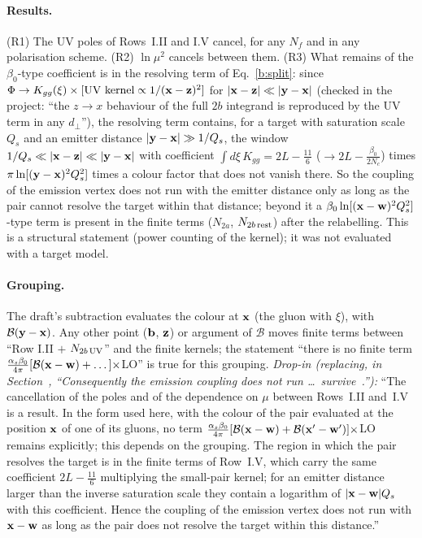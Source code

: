 \paragraph{Results.} (R1) The UV poles of Rows~I.II and I.V cancel, for any $N_f$ and in any polarisation scheme. (R2) $\ln\mu^2$ cancels between them. (R3) What remains of the $\beta_0$-type coefficient is in the resolving term of Eq.~\eqref{b:split}: since $\Phi\to K_{gg}(\xi)\times[\text{UV kernel}\propto1/(\mathbf{x}-\mathbf{z})^2]$ for $|\mathbf{x}-\mathbf{z}|\ll|\mathbf{y}-\mathbf{x}|$ (checked in the project: ``the $z\to x$ behaviour of the full $2b$ integrand is reproduced by the UV term in any $d_\perp$''), the resolving term contains, for a target with saturation scale $Q_s$ and an emitter distance $|\mathbf{y}-\mathbf{x}|\gg1/Q_s$, the window $1/Q_s\ll|\mathbf{x}-\mathbf{z}|\ll|\mathbf{y}-\mathbf{x}|$ with coefficient $\int d\xi\,K_{gg}=2L-\frac{11}{6}$ ($\to2L-\frac{\beta_0}{2N_c}$) times $\pi\ln[(\mathbf{y}-\mathbf{x})^2Q_s^2]$ times a colour factor that does not vanish there. So the coupling of the emission vertex does not run with the emitter distance only as long as the pair cannot resolve the target within that distance; beyond it a $\beta_0\ln[(\mathbf{x}-\mathbf{w})^2Q_s^2]$-type term is present in the finite terms ($N_{2a}$, $N_{2b\,\rm rest}$) after the relabelling. This is a structural statement (power counting of the kernel); it was not evaluated with a target model.

\paragraph{Grouping.} The draft's subtraction evaluates the colour at $\mathbf{x}$ (the gluon with $\xi$), with $\mathcal B(\mathbf{y}-\mathbf{x})$. Any other point ($\mathbf{b}$, $\mathbf{z}$) or argument of $\mathcal B$ moves finite terms between ``Row I.II $+$ $N_{2b\,\rm UV}$'' and the finite kernels; the statement ``there is no finite term $\frac{\alpha_s\beta_0}{4\pi}[\mathcal B(\mathbf{x}-\mathbf{w})+\dots]\times$LO'' is true for this grouping. \emph{Drop-in (replacing, in Section~, ``Consequently the emission coupling does not run \dots\ survive~\cite{Kovner:2023vsy}.''):} ``The cancellation of the poles and of the dependence on $\mu$ between Rows~I.II and~I.V is a result. In the form used here, with the colour of the pair evaluated at the position $\mathbf{x}$ of one of its gluons, no term $\frac{\alpha_s\beta_0}{4\pi}[\mathcal B(\mathbf{x}-\mathbf{w})+\mathcal B(\mathbf{x}'-\mathbf{w}')]\times$LO remains explicitly; this depends on the grouping. The region in which the pair resolves the target is in the finite terms of Row~I.V, which carry the same coefficient $2L-\frac{11}{6}$ multiplying the small-pair kernel; for an emitter distance larger than the inverse saturation scale they contain a logarithm of $|\mathbf{x}-\mathbf{w}|Q_s$ with this coefficient. Hence the coupling of the emission vertex does not run with $\mathbf{x}-\mathbf{w}$ as long as the pair does not resolve the target within this distance.''

